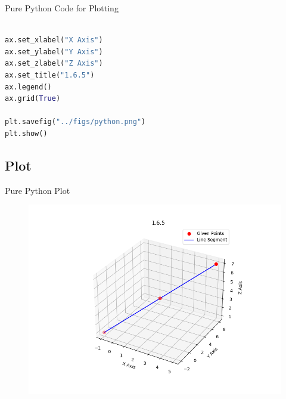 \documentclass{beamer}
\theoremstyle{remark}
\numberwithin{equation}{section}
\begin{document}
\begin{frame}[fragile]{Pure Python Code for Plotting}
\begin{lstlisting}[language=Python]

ax.set_xlabel("X Axis")
ax.set_ylabel("Y Axis")
ax.set_zlabel("Z Axis")
ax.set_title("1.6.5")
ax.legend()
ax.grid(True)

plt.savefig("../figs/python.png")
plt.show()
\end{lstlisting}
\end{frame}

\subsection{Plot}
\begin{frame}{Pure Python Plot}
 \begin{figure}[H]
    \centering
    \includegraphics[width=\columnwidth]{../figs/python.png}
    \caption*{}
    \label{fig:plot_p}
\end{figure}
\end{frame}
\end{document}
